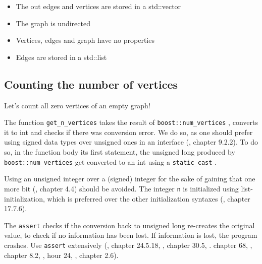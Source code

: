 \begin{itemize}
  \item The out edges and vertices are stored in a std::vector
  \item The graph is undirected
  \item Vertices, edges and graph have no properties
  \item Edges are stored in a std::list
\end{itemize}

\subsection{Counting the number of vertices}
\label{subsec:get_n_vertices}

Let's count all zero vertices of an empty graph!



The function \verb;get_n_vertices; takes the result of \verb;boost::num_vertices;
, converts it to int and checks if there was conversion error.
We do so, as one should prefer using signed data types over unsigned ones
in an interface (\cite{lakos1996large}, chapter 9.2.2).
To do so, in the function body its first statement, 
the unsigned long 
produced by \verb;boost::num_vertices; 
get converted to an int using a \verb;static_cast; .

Using an unsigned integer over a (signed) integer for the sake of gaining
that one more bit (\cite{stroustrup1997}, chapter 4.4) should be avoided.
The integer \verb;n; is initialized using list-initialization, which is preferred
over the other initialization syntaxes (\cite{stroustrup2013}, chapter 17.7.6).

The \verb;assert; checks if the conversion back to unsigned long re-creates the
original value, to check if no information has been lost.
If information is lost, the program crashes.
Use \verb;assert;  extensively 
(\cite{stroustrup1997}, chapter 24.5.18, 
\cite{stroustrup2013}, chapter 30.5, 
\cite{sutter_and_alexandrescu2004}. chapter 68, 
\cite{mcconnell2004code}, chapter 8.2, 
\cite{liberty2001sams}, hour 24, 
\cite{lakos1996large}, chapter 2.6).

